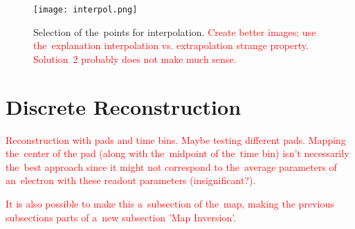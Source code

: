 			\begin{figure}[H]
				\centering
				\texttt{[image: interpol.png]}
				\caption{Selection of the~points for interpolation. \textcolor{red}{Create better images; use the~explanation interpolation vs. extrapolation strange property. Solution~2 probably does not make much sense.}}
				\label{fig:interpol}
			\end{figure}
		
	\section{Discrete Reconstruction}
		\textcolor{red}{Reconstruction with pads and time bins. Maybe testing different pads. Mapping the~center of the pad (along with the~midpoint of the~time bin) isn't necessarily the~best approach since it might not correspond to the~average parameters of an~electron with these readout parameters (insignificant?).}
		
		\textcolor{red}{It is also possible to make this a~subsection of the~map, making the previous subsections parts of a~new subsection 'Map Inversion'.}